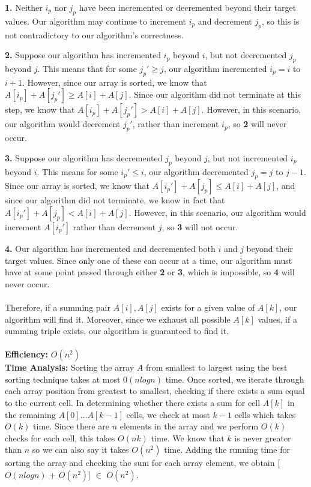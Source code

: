 \documentclass[11pt]{article}
\begin{document}
\noindent \textbf{1.} Neither $i_p$ nor $j_p$ have been incremented or 
decremented beyond their target values. Our algorithm may continue to increment $i_p$ and decrement
$j_p$, so this is not contradictory to our algorithm's correctness.

\noindent \textbf{2.} Suppose our algorithm has incremented $i_p$ beyond $i$, but 
not decremented $j_p$ beyond $j$. This means that for some $j_p' \geq j$, 
our algorithm incremented $i_p = i$ to $i+1$. However, since our array is 
sorted, we know that $A[i_p] + A[j_p'] \geq A[i] + A[j]$. Since our algorithm
did not terminate at this step, we know that $A[i_p] + A[j_p'] > A[i] + A[j]$. However,
in this scenario, our algorithm would decrement $j_p'$, rather than increment
$i_p$, so \textbf{2} will never occur.

\noindent \textbf{3.} Suppose our algorithm has decremented $j_p$ 
beyond $j$, but not incremented $i_p$ beyond $i$. This means for some
$i_p' \leq i$, our algorithm decremented $j_p = j$ to $j-1$. Since our array
is sorted, we know that $A[i_p'] + A[j_p] \leq A[i] + A[j]$, and since our 
algorithm did not terminate, we know in fact that $A[i_p'] + A[j_p] < A[i] + A[j]$. 
However, in this scenario, our algorithm would increment $A[i_p']$ rather 
than decrement $j$, so \textbf{3} will not occur.

\noindent \textbf{4.} Our algorithm has incremented and decremented both $i$ and $j$ 
beyond their target values. Since only one of these can occur at a time, our 
algorithm must have at some point passed through either \textbf{2} or \textbf{3}, 
which is impossible, so \textbf{4} will never occur.\\
\\
Therefore, if a summing pair $A[i], A[j]$ exists for a given value of $A[k]$, 
our algorithm will find it. Moreover, since we exhaust all possible $A[k]$ values, if 
a summing triple exists, our algorithm is guaranteed to find it. 
\\
\\
{\bf Efficiency:} $O(n^{2})$
\\
{\bf Time Analysis:} Sorting the array $A$ from smallest to largest using the best sorting technique takes at most $0(nlogn)$ time. Once sorted, we iterate through each array position from greatest to smallest, checking if there exists a sum equal to the current cell. In determining whether there exists a sum for cell $A[k]$ in the remaining $A[0]...A[k-1]$ cells, we check at most $k-1$ cells which takes $O(k)$ time. Since there are $n$ elements in the array and we perform $O(k)$ checks for each cell, this takes $O(nk)$ time. We know that $k$ is never greater than $n$ so we can also say it takes $O(n^{2})$ time. Adding the running time for sorting the array and checking the sum for each array element, we obtain [$O(nlogn)$ + $O(n^{2})$] $ \in $ $O(n^{2})$.
\end{document}
